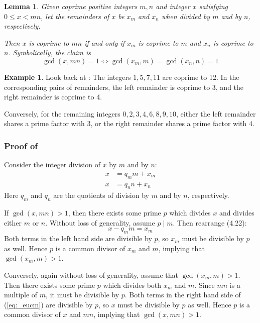 \documentclass[a4paper, 12pt]{article}
\newtheorem{lemma}{Lemma}
\theoremstyle{definition}
\newtheorem{example}{Example}
\begin{document}
\vspace{1em}\begin{lemma}\label{lemma:totientl2}
  Given coprime positive integers $m, n$ and integer $x$ satisfying $0 \leq x < mn$,
  let the remainders of $x$ be $x_m$ and $x_n$ when divided by $m$ and by $n$, respectively.

  Then $x$ is coprime to $mn$ if and only if $x_m$ is coprime to $m$ and $x_n$ is coprime to $n$.
  Symbolically, the claim is
  \begin{equation}
    \gcd(x, mn) = 1 \iff \gcd(x_m, m) = \gcd(x_n, n) = 1
  \end{equation}
\end{lemma}
\vspace{1em}
\begin{example}

  Look back at \textbf{}:
  The integers $1, 5, 7, 11$ are coprime to 12.
  In the corresponding pairs of remainders, the left remainder is coprime to 3,
  and the right remainder is coprime to 4.

  Conversely, for the remaining integers $0, 2, 3, 4, 6, 8, 9, 10$,
  either the left remainder shares a prime factor with 3,
  or the right remainder shares a prime factor with 4.
\end{example}\vspace{1em}

\subsubsection*{Proof of }
Consider the integer division of $x$ by $m$ and by $n$:
\begin{align}
  x &= q_m m + x_m\label{eq:_eucm} \\
  x &= q_n n + x_n
\end{align}
Here $q_m$ and $q_n$ are the quotients of division by $m$ and by $n$, respectively.

If $\gcd(x,mn) > 1$, then there exists some prime $p$ which divides $x$ and divides either $m$ or $n$.
Without loss of generality, assume $p \mid m$.
Then rearrange (4.22):
\begin{equation}
  x - q_m m = x_m
\end{equation}
Both terms in the left hand side are divisible by $p$, so $x_m$ must be divisible by $p$ as well.
Hence $p$ is a common divisor of $x_m$ and $m$, implying that $\gcd(x_m, m) > 1$.

Conversely, again without loss of generality, assume that $\gcd(x_m, m) > 1$.
Then there exists some prime $p$ which divides both $x_m$ and $m$.
Since $mn$ is a multiple of $m$, it must be divisible by $p$.
Both terms in the right hand side of (\ref{eq:_eucm}) are divisible by $p$, so $x$ must be divisible by $p$ as well.
Hence $p$ is a common divisor of $x$ and $mn$, implying that $\gcd(x, mn)>1$.
\end{document}
